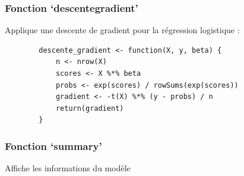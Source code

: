 \documentclass[10pt,french]{report}
\begin{document}
	\subsubsection{Fonction \enquote*{descente\textunderscore gradient}}

	Applique une descente de gradient pour la régression logistique :
	\begin{verbatim}
		descente_gradient <- function(X, y, beta) {
			n <- nrow(X)
			scores <- X %*% beta
			probs <- exp(scores) / rowSums(exp(scores))
			gradient <- -t(X) %*% (y - probs) / n
			return(gradient)
		}
	\end{verbatim}

	\subsubsection{Fonction \enquote*{summary}}
    Affiche les informations du modèle 
\end{document}

